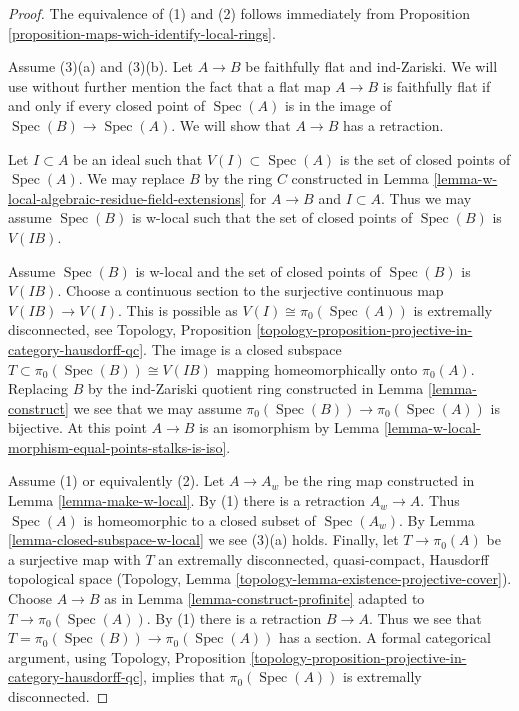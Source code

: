 \documentclass{stacks-project}
\theoremstyle{plain}
\theoremstyle{definition}
\theoremstyle{remark}
\numberwithin{equation}{subsection}
\def\Spec{\mathop{\mathrm{Spec}}}
\begin{document}
\begin{proof}
The equivalence of (1) and (2) follows immediately from
Proposition \ref{proposition-maps-wich-identify-local-rings}.

\medskip\noindent
Assume (3)(a) and (3)(b). Let $A \to B$ be faithfully flat and ind-Zariski.
We will use without further mention the fact that a flat map
$A \to B$ is faithfully flat if and only if every closed point
of $\Spec(A)$ is in the image of $\Spec(B) \to \Spec(A)$.
We will show that $A \to B$ has a retraction.

\medskip\noindent
Let $I \subset A$ be an ideal such that $V(I) \subset \Spec(A)$ is
the set of closed points of $\Spec(A)$. 
We may replace $B$ by the ring $C$ constructed in
Lemma \ref{lemma-w-local-algebraic-residue-field-extensions}
for $A \to B$ and $I \subset A$.
Thus we may assume $\Spec(B)$ is w-local such that the set of
closed points of $\Spec(B)$ is $V(IB)$.

\medskip\noindent
Assume $\Spec(B)$ is w-local and the set of closed points of $\Spec(B)$
is $V(IB)$. Choose a continuous section to the surjective
continuous map $V(IB) \to V(I)$. This is possible as
$V(I) \cong \pi_0(\Spec(A))$ is extremally disconnected, see
Topology, Proposition
\ref{topology-proposition-projective-in-category-hausdorff-qc}.
The image is a closed subspace $T \subset \pi_0(\Spec(B)) \cong V(IB)$
mapping homeomorphically onto $\pi_0(A)$. Replacing $B$ by the ind-Zariski
quotient ring constructed in Lemma \ref{lemma-construct}
we see that we may assume $\pi_0(\Spec(B)) \to \pi_0(\Spec(A))$
is bijective. At this point $A \to B$ is an isomorphism by
Lemma \ref{lemma-w-local-morphism-equal-points-stalks-is-iso}.

\medskip\noindent
Assume (1) or equivalently (2). Let $A \to A_w$ be the ring map constructed in
Lemma \ref{lemma-make-w-local}. By (1) there is a retraction $A_w \to A$.
Thus $\Spec(A)$ is homeomorphic to a closed subset of $\Spec(A_w)$. By
Lemma \ref{lemma-closed-subspace-w-local} we see (3)(a) holds.
Finally, let $T \to \pi_0(A)$ be a surjective map with $T$ an
extremally disconnected, quasi-compact, Hausdorff topological space
(Topology, Lemma \ref{topology-lemma-existence-projective-cover}).
Choose $A \to B$ as in Lemma \ref{lemma-construct-profinite}
adapted to $T \to \pi_0(\Spec(A))$. By (1) there is a retraction
$B \to A$. Thus we see that $T = \pi_0(\Spec(B)) \to \pi_0(\Spec(A))$
has a section. A formal categorical argument, using
Topology, Proposition
\ref{topology-proposition-projective-in-category-hausdorff-qc},
implies that $\pi_0(\Spec(A))$ is extremally disconnected.
\end{proof}
\end{document}
